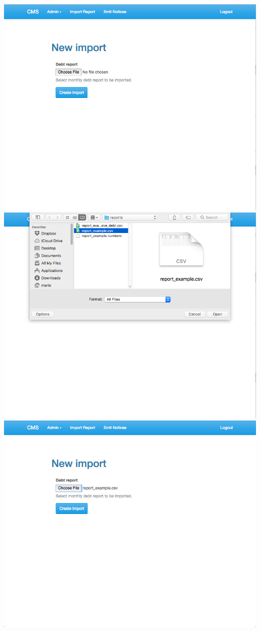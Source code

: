 \begin{itemize}
    \includegraphics[scale=0.25]{./images/ss/import/2.png}\\
    \includegraphics[scale=0.25]{./images/ss/import/3.png}
    \includegraphics[scale=0.25]{./images/ss/import/4.png}\\

\end{itemize}
